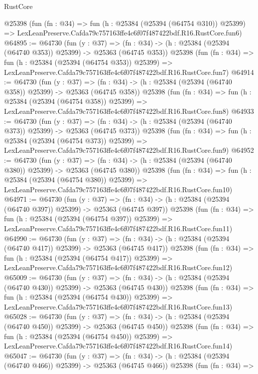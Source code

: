 \begin{lexlean}{RustCore}
\begin{coremodule}
    @25398
    (fun (fn : @34) =>
    fun (h : @25384 (@25394 (@64754 @310)) @25399) =>
    LexLeanPreserve.Cafda79c757163ffe4c6f07f487422bdf.R16.RustCore.fun6)
@64895 := @64730
    (fun (y : @37) =>
    (fn : @34) -> (h : @25384 (@25394 (@64740 @353)) @25399) -> @25363 (@64745 @353))
    @25398
    (fun (fn : @34) =>
    fun (h : @25384 (@25394 (@64754 @353)) @25399) =>
    LexLeanPreserve.Cafda79c757163ffe4c6f07f487422bdf.R16.RustCore.fun7)
@64914 := @64730
    (fun (y : @37) =>
    (fn : @34) -> (h : @25384 (@25394 (@64740 @358)) @25399) -> @25363 (@64745 @358))
    @25398
    (fun (fn : @34) =>
    fun (h : @25384 (@25394 (@64754 @358)) @25399) =>
    LexLeanPreserve.Cafda79c757163ffe4c6f07f487422bdf.R16.RustCore.fun8)
@64933 := @64730
    (fun (y : @37) =>
    (fn : @34) -> (h : @25384 (@25394 (@64740 @373)) @25399) -> @25363 (@64745 @373))
    @25398
    (fun (fn : @34) =>
    fun (h : @25384 (@25394 (@64754 @373)) @25399) =>
    LexLeanPreserve.Cafda79c757163ffe4c6f07f487422bdf.R16.RustCore.fun9)
@64952 := @64730
    (fun (y : @37) =>
    (fn : @34) -> (h : @25384 (@25394 (@64740 @380)) @25399) -> @25363 (@64745 @380))
    @25398
    (fun (fn : @34) =>
    fun (h : @25384 (@25394 (@64754 @380)) @25399) =>
    LexLeanPreserve.Cafda79c757163ffe4c6f07f487422bdf.R16.RustCore.fun10)
@64971 := @64730
    (fun (y : @37) =>
    (fn : @34) -> (h : @25384 (@25394 (@64740 @397)) @25399) -> @25363 (@64745 @397))
    @25398
    (fun (fn : @34) =>
    fun (h : @25384 (@25394 (@64754 @397)) @25399) =>
    LexLeanPreserve.Cafda79c757163ffe4c6f07f487422bdf.R16.RustCore.fun11)
@64990 := @64730
    (fun (y : @37) =>
    (fn : @34) -> (h : @25384 (@25394 (@64740 @417)) @25399) -> @25363 (@64745 @417))
    @25398
    (fun (fn : @34) =>
    fun (h : @25384 (@25394 (@64754 @417)) @25399) =>
    LexLeanPreserve.Cafda79c757163ffe4c6f07f487422bdf.R16.RustCore.fun12)
@65009 := @64730
    (fun (y : @37) =>
    (fn : @34) -> (h : @25384 (@25394 (@64740 @430)) @25399) -> @25363 (@64745 @430))
    @25398
    (fun (fn : @34) =>
    fun (h : @25384 (@25394 (@64754 @430)) @25399) =>
    LexLeanPreserve.Cafda79c757163ffe4c6f07f487422bdf.R16.RustCore.fun13)
@65028 := @64730
    (fun (y : @37) =>
    (fn : @34) -> (h : @25384 (@25394 (@64740 @450)) @25399) -> @25363 (@64745 @450))
    @25398
    (fun (fn : @34) =>
    fun (h : @25384 (@25394 (@64754 @450)) @25399) =>
    LexLeanPreserve.Cafda79c757163ffe4c6f07f487422bdf.R16.RustCore.fun14)
@65047 := @64730
    (fun (y : @37) =>
    (fn : @34) -> (h : @25384 (@25394 (@64740 @466)) @25399) -> @25363 (@64745 @466))
    @25398
    (fun (fn : @34) =>

\end{coremodule}
\end{lexlean}

